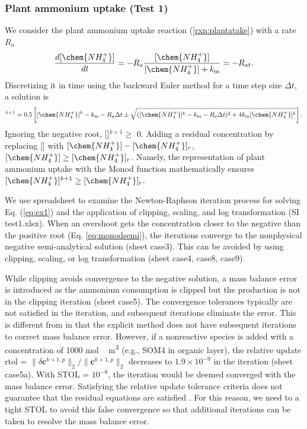 \documentclass[gmd, manuscript]{copernicus}
\begin{document}
\subsubsection{Plant ammonium uptake (Test 1)}
We consider the plant ammonium uptake reaction (\ref{rxn:plantatake}) with a
rate $R_a$
\begin{equation}
\frac{d[\chem{NH_4^+}]}{dt} =- R_a \frac{[\chem{NH_4^+}]}{[\chem{NH_4^+}]+k_\text{m}} = -R_{at}.
\label{eq:ex1}
\end{equation}
Discretizing it in
time using the backward Euler method for a time step size $\Delta t$, a solution is
\begin{equation}
[\chem{NH_4^+}]^{k+1}=0.5 \left[[\chem{NH_4^+}]^k - k_\text{m} - R_a \Delta t
\pm \sqrt{([\chem{NH_4^+}]^k - k_\text{m} - R_a\Delta t)^2 + 4
k_\text{m}[\chem{NH_4^+}]^k}\right].
\label{eq:monodsemi}
\end{equation}
Ignoring the negative root, []$^{k+1}\geq$
0. Adding a residual concentration by replacing [] with $[\chem{NH_4^+}]-[\chem{NH_4^+}]_r$, $[\chem{NH_4^+}]\geq[\chem{NH_4^+}]_r$. Namely, the representation of plant ammonium uptake with the Monod function mathematically ensures $[\chem{NH_4^+}]^{k+1} \geq [\chem{NH_4^+}]_\text{r}$. 

We use spreadsheet to examine the Newton-Raphson iteration process for solving Eq. (\ref{eq:ex1}) and the application of clipping, scaling, and log transformation (SI test1.xlsx). 
When an overshoot gets the concentration closer to the negative than the positive root (Eq. \ref{eq:monodsemi}), the iterations converge to the nonphysical negative semi-analytical solution (sheet case3). This can be avoided by using clipping, scaling, or log transformation (sheet case4, case8, case9). 

While clipping avoids convergence to the negative solution, a mass balance error is introduced as the ammonium consumption is clipped but the  production is not in the clipping iteration (sheet case5). The convergence tolerances typically are not satisfied in the iteration, and subsequent iterations eliminate the error. This is different from \citep{Tang2015} in that the explicit method does not have subsequent iterations to correct mass balance error. However, if a nonreactive species is added with a concentration of 1000 \unit{mol\,m^3} (e.g., SOM4 in organic layer), the relative update rtol = ${\|\delta \mathbf{c}^{k+1,p}\|_2}/{\|\mathbf{c}^{k+1,p} \|_2}$ decreases to $1.9\times 10^{-9}$ in the iteration (sheet case5a). With STOL = $10^{-8}$, the iteration would be deemed converged with the mass balance error. Satisfying the relative update tolerance criteria does not guarantee that the residual equations are satisfied \citep{Lichtner2015}. For this reason, we need to a tight STOL to avoid this false convergence so that additional iterations can be taken to resolve the mass balance error. 
 
\end{document}
